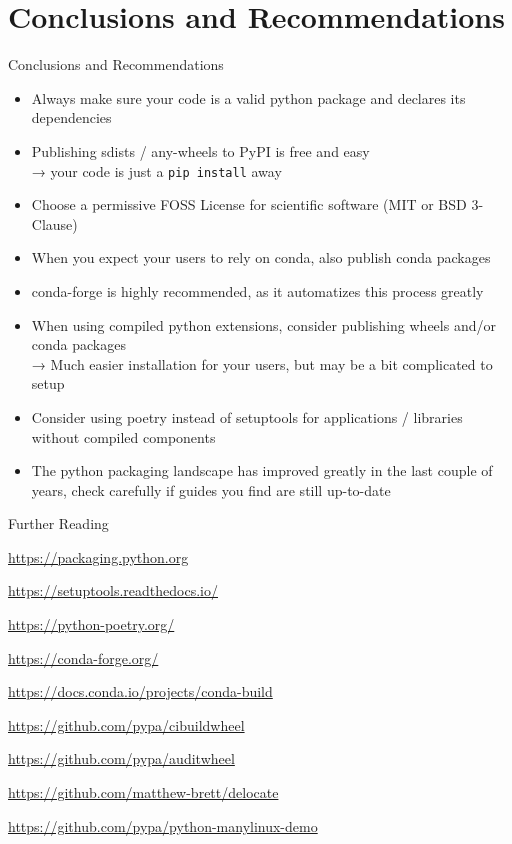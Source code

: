 \section{Conclusions and Recommendations}

\begin{frame}[c]{Conclusions and Recommendations}
  \begin{itemize}
    \item Always make sure your code is a valid python package and declares its dependencies
    \item Publishing sdists / any-wheels to PyPI is free and easy \\
      → your code is just a \texttt{pip install} away
    \item Choose a permissive FOSS License for scientific software (MIT or BSD 3-Clause)
    \item When you expect your users to rely on conda, also publish conda packages
    \item conda-forge is highly recommended, as it automatizes this process greatly
    \item When using compiled python extensions, consider publishing wheels and/or conda packages \\
      → Much easier installation for your users, but may be a bit complicated to setup
    \item Consider using poetry instead of setuptools for applications / libraries without compiled components
    \item The python packaging landscape has improved greatly in the last couple of years, check carefully if guides
      you find are still up-to-date
  \end{itemize}
\end{frame}

\begin{frame}[c]{Further Reading}
  \begin{description}
    \item[PyPA User Guide] \url{https://packaging.python.org}
    \item[setuptools docs] \url{https://setuptools.readthedocs.io/}
    \item[poetry] \url{https://python-poetry.org/}

    \medskip
    \item[conda-forge] \url{https://conda-forge.org/}
    \item[conda build docs] \url{https://docs.conda.io/projects/conda-build}

    \medskip
    \item[cibuildwheel] \url{https://github.com/pypa/cibuildwheel}
    \item[auditwheel] \url{https://github.com/pypa/auditwheel}
    \item[delocate] \url{https://github.com/matthew-brett/delocate}
    \item[manylinux demo] \url{https://github.com/pypa/python-manylinux-demo}
  \end{description}
\end{frame}


